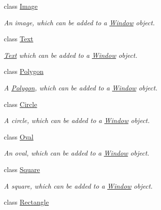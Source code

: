 \begin{DoxyCompactItemize}
class \hyperlink{classcs110graphics_1_1Image}{Image}
\begin{DoxyCompactList}\small\item\em An image, which can be added to a \hyperlink{classcs110graphics_1_1Window}{Window} object. \item\end{DoxyCompactList}\item 
class \hyperlink{classcs110graphics_1_1Text}{Text}
\begin{DoxyCompactList}\small\item\em \hyperlink{classcs110graphics_1_1Text}{Text} which can be added to a \hyperlink{classcs110graphics_1_1Window}{Window} object. \item\end{DoxyCompactList}\item 
class \hyperlink{classcs110graphics_1_1Polygon}{Polygon}
\begin{DoxyCompactList}\small\item\em A \hyperlink{classcs110graphics_1_1Polygon}{Polygon}, which can be added to a \hyperlink{classcs110graphics_1_1Window}{Window} object. \item\end{DoxyCompactList}\item 
class \hyperlink{classcs110graphics_1_1Circle}{Circle}
\begin{DoxyCompactList}\small\item\em A circle, which can be added to a \hyperlink{classcs110graphics_1_1Window}{Window} object. \item\end{DoxyCompactList}\item 
class \hyperlink{classcs110graphics_1_1Oval}{Oval}
\begin{DoxyCompactList}\small\item\em An oval, which can be added to a \hyperlink{classcs110graphics_1_1Window}{Window} object. \item\end{DoxyCompactList}\item 
class \hyperlink{classcs110graphics_1_1Square}{Square}
\begin{DoxyCompactList}\small\item\em A square, which can be added to a \hyperlink{classcs110graphics_1_1Window}{Window} object. \item\end{DoxyCompactList}\item 
class \hyperlink{classcs110graphics_1_1Rectangle}{Rectangle}

\end{DoxyCompactItemize}
